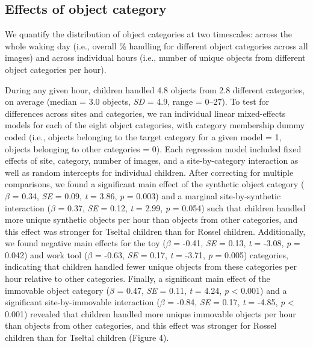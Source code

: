 \documentclass[10pt, letterpaper]{article}
\begin{document}
\hypertarget{effects-of-object-category}{%
\subsection{Effects of object
category}\label{effects-of-object-category}}

We quantify the distribution of object categories at two timescales:
across the whole waking day (i.e., overall \% handling for different
object categories across all images) and across individual hours (i.e.,
number of unique objects from different object categories per hour).

During any given hour, children handled 4.8 objects from 2.8 different
categories, on average (median = 3.0 objects, \emph{SD} = 4.9, range =
0--27). To test for differences across sites and categories, we ran
individual linear mixed-effects models for each of the eight object
categories, with category membership dummy coded (i.e., objects
belonging to the target category for a given model = 1, objects
belonging to other categories = 0). Each regression model included fixed
effects of site, category, number of images, and a site-by-category
interaction as well as random intercepts for individual children. After
correcting for multiple comparisons, we found a significant main effect
of the synthetic object category (\(\beta\) = 0.34, \emph{SE} = 0.09,
\emph{t} = 3.86, \emph{p} = 0.003) and a marginal site-by-synthetic
interaction (\(\beta\) = 0.37, \emph{SE} = 0.12, \emph{t} = 2.99,
\emph{p} = 0.054) such that children handled more unique synthetic
objects per hour than objects from other categories, and this effect was
stronger for Tseltal children than for Rossel children. Additionally, we
found negative main effects for the toy (\(\beta\) = -0.41, \emph{SE} =
0.13, \emph{t} = -3.08, \emph{p} = 0.042) and work tool (\(\beta\) =
-0.63, \emph{SE} = 0.17, \emph{t} = -3.71, \emph{p} = 0.005) categories,
indicating that children handled fewer unique objects from these
categories per hour relative to other categories. Finally, a significant
main effect of the immovable object category (\(\beta\) = 0.47,
\emph{SE} = 0.11, \emph{t} = 4.24, \emph{p} \textless{} 0.001) and a
significant site-by-immovable interaction (\(\beta\) = -0.84, \emph{SE}
= 0.17, \emph{t} = -4.85, \emph{p} \textless{} 0.001) revealed that
children handled more unique immovable objects per hour than objects
from other categories, and this effect was stronger for Rossel children
than for Tseltal children (Figure 4).
\end{document}
